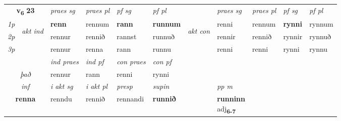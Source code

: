 \noindent
\begin{tabular}{lllllllllll} \toprule
\multicolumn{2}{c}{\textbf{v{\textsubscript{6}}} \Large{\textbf{23}}}  &  \textit{praes sg}  & \textit{praes pl}  &\textit{ pf sg} & \textit{pf pl} &  &  \textit{praes sg}  & \textit{praes pl}  & \textit{pf sg} & \textit{pf pl } \\*
	\cmidrule{3-6} \cmidrule{8-11}
 {\textit{1p}} & \multirow{3}{*}{\begin{turn}{90}\textit{akt ind}\end{turn}} & \textbf{renn} & rennum & \textbf{rann} & \textbf{runnum} & \multirow{3}{*}{\begin{turn}{90}\textit{akt con}\end{turn}} &renni & rennum & \textbf{rynni} & rynnum\\*
 {\textit{2p}} &  &  rennur  & rennið & rannst & runnuð & & rennir & rennið & rynnir & rynnuð \\*
{\textit{3p}} &  & rennur & renna & rann & runnu & & renni & renni& rynni & rynnu \\*
\cmidrule{3-6} \cmidrule{8-11}

   & &  \textit{ind praes} & \textit{ind pf} & \textit{con praes} & \textit{con pf} \\*
\multicolumn{2}{c}{ \textit{það} } & rennur & rann & renni & rynni \\*

\cmidrule{3-8}
   \multicolumn{2}{c}{\textit{inf}}  & \textit{i akt sg} & \textit{i akt pl}   & \textit{presp} & \textit{supin}  && \textit{pp m} \\*
  \multicolumn{2}{c}{\textbf{renna}} & renndu  & rennið   & rennandi &  \textbf{runnið}  && \specialcell{\textbf{runninn} \\ adj\textbf{\textsubscript{6-7}}} \\*
\end{tabular}

